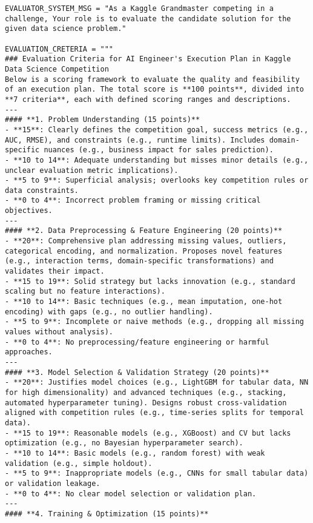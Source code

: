 \begin{lstlisting}[style=pythonstyle]
EVALUATOR_SYSTEM_MSG = "As a Kaggle Grandmaster competing in a challenge, Your role is to evaluate the candidate solution for the given data science problem."

EVALUATION_CRETERIA = """
### Evaluation Criteria for AI Engineer's Execution Plan in Kaggle Data Science Competition  
Below is a scoring framework to evaluate the quality and feasibility of an execution plan. The total score is **100 points**, divided into **7 criteria**, each with defined scoring ranges and descriptions.  
---
#### **1. Problem Understanding (15 points)**  
- **15**: Clearly defines the competition goal, success metrics (e.g., AUC, RMSE), and constraints (e.g., runtime limits). Includes domain-specific nuances (e.g., business impact for sales prediction).  
- **10 to 14**: Adequate understanding but misses minor details (e.g., unclear evaluation metric implications).  
- **5 to 9**: Superficial analysis; overlooks key competition rules or data constraints.  
- **0 to 4**: Incorrect problem framing or missing critical objectives.  
---
#### **2. Data Preprocessing & Feature Engineering (20 points)**  
- **20**: Comprehensive plan addressing missing values, outliers, categorical encoding, and normalization. Proposes novel features (e.g., interaction terms, domain-specific transformations) and validates their impact.  
- **15 to 19**: Solid strategy but lacks innovation (e.g., standard scaling but no feature interactions).  
- **10 to 14**: Basic techniques (e.g., mean imputation, one-hot encoding) with gaps (e.g., no outlier handling).  
- **5 to 9**: Incomplete or naive methods (e.g., dropping all missing values without analysis).  
- **0 to 4**: No preprocessing/feature engineering or harmful approaches.  
---
#### **3. Model Selection & Validation Strategy (20 points)**  
- **20**: Justifies model choices (e.g., LightGBM for tabular data, NN for high dimensionality) and advanced techniques (e.g., stacking, automated hyperparameter tuning). Designs robust cross-validation aligned with competition rules (e.g., time-series splits for temporal data).  
- **15 to 19**: Reasonable models (e.g., XGBoost) and CV but lacks optimization (e.g., no Bayesian hyperparameter search).  
- **10 to 14**: Basic models (e.g., random forest) with weak validation (e.g., simple holdout).  
- **5 to 9**: Inappropriate models (e.g., CNNs for small tabular data) or validation leakage.  
- **0 to 4**: No clear model selection or validation plan.  
---
#### **4. Training & Optimization (15 points)**  

\end{lstlisting}
